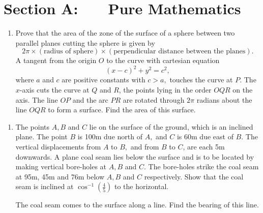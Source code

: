 \documentclass[a4, 11pt]{report}
\newlength{\qspace}
\newcounter{qnumber}
\newenvironment{question}%
 {\vspace{\qspace}
  \begin{enumerate}[\bfseries 1\quad][10]%
    \setcounter{enumi}{\value{qnumber}}%
    \item%
 }
{
  \end{enumerate}
  \filbreak
  \stepcounter{qnumber}
 }
\begin{document}
\setcounter{page}{2}

 
\section*{Section A: \ \ \ Pure Mathematics}

\begin{question}
Prove that the area of the zone of the surface of a sphere between
two parallel planes cutting the sphere is given by 
\[
2\pi\times(\mbox{radius of sphere})\times(\mbox{perpendicular distance between the planes}).
\]
A tangent from the origin $O$ to the curve with cartesian equation
\[
(x-c)^{2}+y^{2}=c^{2},
\]
where $a$ and $c$ are positive constants with $c>a,$ touches the
curve at $P$. The $x$-axis cuts the curve at $Q$ and $R$, the
points lying in the order $OQR$ on the axis. The line $OP$ and the
arc $PR$ are rotated through $2\pi$ radians about the line $OQR$
to form a surface. Find the area of this surface.
\end{question}
\vspace{-1cm}
\begin{question}
The points $A,B$ and $C$ lie on the surface of the ground, which
is an inclined plane. The point $B$ is 100m due north of $A,$ and
$C$ is 60m due east of $B$. The vertical displacements from $A$
to $B,$ and from $B$ to $C$, are each 5m downwards. A plane coal
seam lies below the surface and is to be located by making vertical
bore-holes at $A,B$ and $C$. The bore-holes strike the coal seam
at 95m, 45m and 76m below $A,B$ and $C$ respectively. Show that
the coal seam is inclined at $\cos^{-1}(\frac{4}{5})$ to the horizontal. 


The coal seam comes to the surface along a line. Find the bearing
of this line. 
\end{question}
\end{document}
